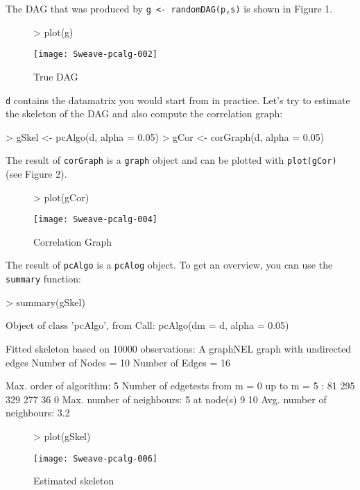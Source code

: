\documentclass[a4paper]{article}
\begin{document}
The DAG that was produced by \texttt{g <- randomDAG(p,s)} is shown in Figure 1.
\begin{figure}[htbp]
  \centering
\begin{Schunk}
\begin{Sinput}
> plot(g)
\end{Sinput}
\end{Schunk}
\texttt{[image: Sweave-pcalg-002]}
\label{fig:trueDAG}
\caption{True DAG}
\end{figure}

\texttt{d} contains the datamatrix you would start from in
practice. Let's try to estimate the skeleton of the DAG and also compute
the correlation graph:
\begin{Schunk}
\begin{Sinput}
> gSkel <- pcAlgo(d, alpha = 0.05)
> gCor <- corGraph(d, alpha = 0.05)
\end{Sinput}
\end{Schunk}

The result of \texttt{corGraph} is a \texttt{graph} object and can be plotted
with \texttt{plot(gCor)} (see Figure 2).
\begin{figure}[htbp]
  \centering
\begin{Schunk}
\begin{Sinput}
> plot(gCor)
\end{Sinput}
\end{Schunk}
\texttt{[image: Sweave-pcalg-004]}
\label{fig:corGraph}
\caption{Correlation Graph}
\end{figure}

The result of \texttt{pcAlgo} is a
\texttt{pcAlog} object. To get an overview, you can use the
\texttt{summary} function:
\begin{Schunk}
\begin{Sinput}
> summary(gSkel)
\end{Sinput}
\begin{Soutput}
Object of class 'pcAlgo', from Call: 
 pcAlgo(dm = d, alpha = 0.05) 

Fitted skeleton based on  10000 observations:
A graphNEL graph with undirected edges
Number of Nodes = 10 
Number of Edges = 16 

Max. order of algorithm:  5 
Number of edgetests from m = 0 up to m = 5 :  81 295 329 277 36 0
Max. number of neighbours:  5 at node(s) 9 10 
Avg. number of neighbours:  3.2 
\end{Soutput}
\end{Schunk}

\begin{figure}[htbp]
  \centering
\begin{Schunk}
\begin{Sinput}
> plot(gSkel)
\end{Sinput}
\end{Schunk}
\texttt{[image: Sweave-pcalg-006]}
\label{fig:skel}
\caption{Estimated skeleton}
\end{figure}
\end{document}
